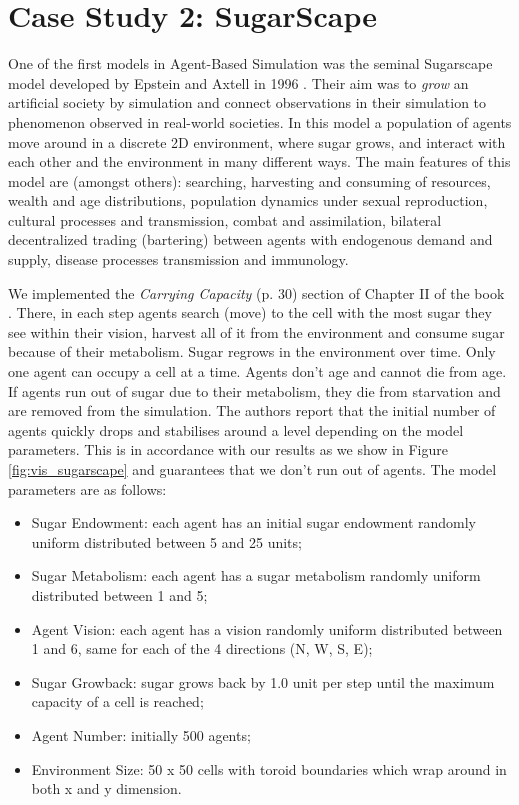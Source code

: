 \section{Case Study 2: SugarScape} %
\label{sec:cs_sugarscape}

One of the first models in Agent-Based Simulation was the seminal Sugarscape model developed by Epstein and Axtell in 1996 \cite{epstein_growing_1996}. Their aim was to \textit{grow} an artificial society by simulation and connect observations in their simulation to phenomenon observed in real-world societies. In this model a population of agents move around in a discrete 2D environment, where sugar grows, and interact with each other and the environment in many different ways. The main features of this model are (amongst others): searching, harvesting and consuming of resources, wealth and age distributions, population dynamics under sexual reproduction, cultural processes and transmission, combat and assimilation, bilateral decentralized trading (bartering) between agents with endogenous demand and supply, disease processes transmission and immunology.

We implemented the \textit{Carrying Capacity} (p. 30) section of Chapter II of the book \cite{epstein_growing_1996}. There, in each step agents search (move) to the cell with the most sugar they see within their vision, harvest all of it from the environment and consume sugar because of their metabolism. Sugar regrows in the environment over time. Only one agent can occupy a cell at a time. Agents don't age and cannot die from age. If agents run out of sugar due to their metabolism, they die from starvation and are removed from the simulation. The authors report that the initial number of agents quickly drops and stabilises around a level depending on the model parameters. This is in accordance with our results as we show in Figure \ref{fig:vis_sugarscape} and guarantees that we don't run out of agents. The model parameters are as follows:

\begin{itemize}
	\item Sugar Endowment: each agent has an initial sugar endowment randomly uniform distributed between 5 and 25 units;
	\item Sugar Metabolism: each agent has a sugar metabolism randomly uniform distributed between 1 and 5;
	\item Agent Vision: each agent has a vision randomly uniform distributed between 1 and 6, same for each of the 4 directions (N, W, S, E);
	\item Sugar Growback: sugar grows back by 1.0 unit per step until the maximum capacity of a cell is reached;
	\item Agent Number: initially 500 agents;
	\item Environment Size: 50 x 50 cells with toroid boundaries which wrap around in both x and y dimension.
\end{itemize}

